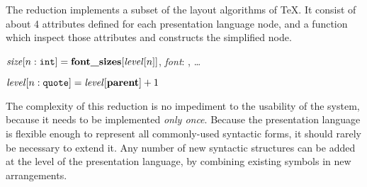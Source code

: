 The reduction implements a subset of the layout algorithms of \TeX. It consist of about 4 attributes defined for each presentation language node, and a  function which inspect those attributes and constructs the simplified node. 


$\mathit{size}[n: \texttt{int}] = \textbf{font\_sizes}[\mathit{level}[n]]$, \textit{font}: , \dots

$\mathit{level}[n: \texttt{quote}] = \mathit{level}[\textbf{parent}] + 1$

The complexity of this reduction is no impediment to the usability of the system, because it needs to be implemented \emph{only once}. Because the presentation language is flexible enough to represent all commonly-used syntactic forms, it should rarely be necessary to extend it. Any number of new syntactic structures can be added at the level of the presentation language, by combining existing symbols in new arrangements. 


